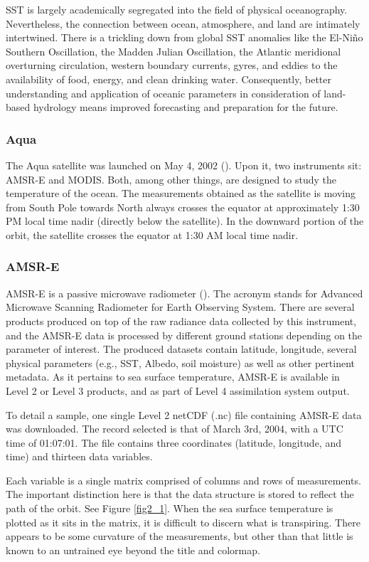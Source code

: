 \begin{refsection}
SST is largely academically segregated into the field of physical oceanography. Nevertheless, the connection between ocean, atmosphere, and land are intimately intertwined. There is a trickling down from global SST anomalies like the El-Niño Southern Oscillation, the Madden Julian Oscillation, the Atlantic meridional overturning circulation, western boundary currents, gyres, and eddies to the availability of food, energy, and clean drinking water. Consequently, better understanding and application of oceanic parameters in consideration of land-based hydrology means improved forecasting and preparation for the future. 

\subsubsection{Aqua}
The Aqua satellite was launched on May 4, 2002 (\cite{parkinson2003aqua}). Upon it, two instruments sit: AMSR-E and MODIS. Both, among other things, are designed to study the temperature of the ocean. The measurements obtained as the satellite is moving from South Pole towards North always crosses the equator at approximately 1:30 PM local time nadir (directly below the satellite). In the downward portion of the orbit, the satellite crosses the equator at 1:30 AM local time nadir. 

\subsubsection{AMSR-E}
AMSR-E is a passive microwave radiometer (\cite{kawanishi2003advanced}). The acronym stands for Advanced Microwave Scanning Radiometer for Earth Observing System. There are several products produced on top of the raw radiance data collected by this instrument, and the AMSR-E data is processed by different ground stations depending on the parameter of interest. The produced datasets contain latitude, longitude, several physical parameters (e.g., SST, Albedo, soil moisture) as well as other pertinent metadata. As it pertains to sea surface temperature, AMSR-E is available in Level 2 or Level 3 products, and as part of Level 4 assimilation system output. 

To detail a sample, one single Level 2 netCDF (.nc) file containing AMSR-E data was downloaded. The record selected is that of March 3rd, 2004, with a UTC time of 01:07:01. The file contains three coordinates (latitude, longitude, and time) and thirteen data variables.

Each variable is a single matrix comprised of columns and rows of measurements. The important distinction here is that the data structure is stored to reflect the path of the orbit. See Figure \ref{fig2_1}. When the sea surface temperature is plotted as it sits in the matrix, it is difficult to discern what is transpiring. There appears to be some curvature of the measurements, but other than that little is known to an untrained eye beyond the title and colormap.


\end{refsection}
